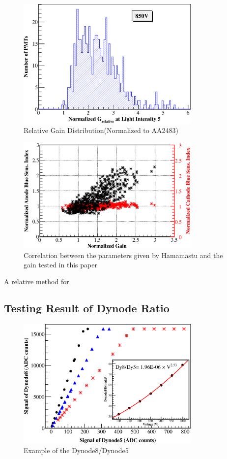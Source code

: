 \documentclass[5p, times]{elsarticle}
\begin{document}
\begin{figure}[h!]
 \centering
 \includegraphics[width=90mm]{GainDist}
\caption{Relative Gain Distribution(Normalized to AA2483)}
\label{fig:gain_dist}
\end{figure} 

\begin{figure}[h!]
 \centering
 \includegraphics[width=90mm]{correlation}
\caption{Correlation between the parameters given by Hamamastu and the gain tested in this paper}
\label{fig:correl_abVSgain}
\end{figure} 

A relative method for 


\subsection{Testing Result of Dynode Ratio}
\label{sec:psd_dy58}

\begin{figure}[h!]
 \centering
 \includegraphics[width=90mm]{dy58_example}
\caption{Example of the Dynode8/Dynode5}
\label{fig:dy58_example}
\end{figure} 
\end{document}
